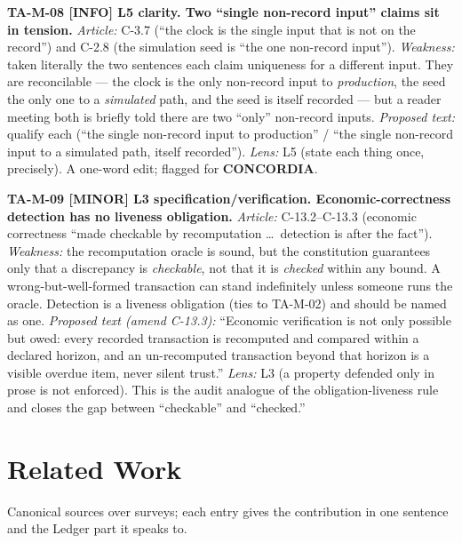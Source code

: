 \documentclass[11pt,a4paper]{article}
\newcommand{\sev}[1]{\textbf{[#1]}}
\newcommand{\lens}[1]{\textnormal{#1}}
\newcommand{\finding}[1]{\medskip\noindent\textbf{#1}}
\begin{document}
\finding{TA-M-08 \sev{INFO} \lens{L5 clarity}. Two ``single non-record input'' claims sit in
tension.}
\emph{Article:} C-3.7 (``the clock is the single input that is not on the record'') and C-2.8
(the simulation seed is ``the one non-record input''). \emph{Weakness:} taken literally the two
sentences each claim uniqueness for a different input. They are reconcilable --- the clock is
the only non-record input to \emph{production}, the seed the only one to a \emph{simulated}
path, and the seed is itself recorded --- but a reader meeting both is briefly told there are two
``only'' non-record inputs. \emph{Proposed text:} qualify each (``the single non-record input to
production'' / ``the single non-record input to a simulated path, itself recorded''). \emph{Lens:}
L5 (state each thing once, precisely). A one-word edit; flagged for \textbf{CONCORDIA}.

\finding{TA-M-09 \sev{MINOR} \lens{L3 specification/verification}. Economic-correctness detection
has no liveness obligation.}
\emph{Article:} C-13.2--C-13.3 (economic correctness ``made checkable by recomputation \dots\
detection is after the fact''). \emph{Weakness:} the recomputation oracle is sound, but the
constitution guarantees only that a discrepancy is \emph{checkable}, not that it is \emph{checked}
within any bound. A wrong-but-well-formed transaction can stand indefinitely unless someone runs
the oracle. Detection is a liveness obligation (ties to TA-M-02) and should be named as one.
\emph{Proposed text (amend C-13.3):} ``Economic verification is not only possible but owed:
every recorded transaction is recomputed and compared within a declared horizon, and an
un-recomputed transaction beyond that horizon is a visible overdue item, never silent trust.''
\emph{Lens:} L3 (a property defended only in prose is not enforced). This is the audit analogue
of the obligation-liveness rule and closes the gap between ``checkable'' and ``checked.''

\section{Related Work}

Canonical sources over surveys; each entry gives the contribution in one sentence and the
Ledger part it speaks to.
\end{document}
